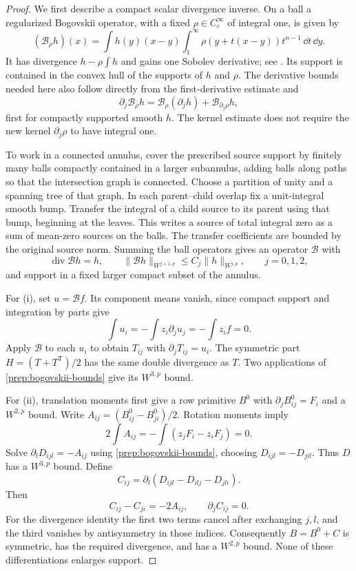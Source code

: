 \begin{proof}
We first describe a compact scalar divergence inverse.  On a ball a
regularized Bogovskii operator, with a fixed
$\rho\in C_c^\infty$ of integral one, is given by
\[
 (\mathcal B_\rho h)(x)
 =\int h(y)(x-y)\int_1^\infty
       \rho(y+t(x-y))t^{n-1}\,\dd t\,\dd y.
\]
It has divergence $h-\rho\int h$ and gains one Sobolev derivative;
see \cite{CostabelMcIntosh2010}.  Its support is contained in the
convex hull of the supports of $h$ and $\rho$.  The derivative bounds
needed here also follow directly from the first-derivative estimate
and
\[
 \partial_j\mathcal B_\rho h
 =\mathcal B_\rho(\partial_jh)
       +\mathcal B_{\partial_j\rho}h,
\]
first for compactly supported smooth $h$.  The kernel estimate does not
require the new kernel $\partial_j\rho$ to have integral one.

To work in a connected annulus, cover the prescribed source support by
finitely many balls compactly contained in a larger subannulus, adding
balls along paths so that the intersection graph is connected.  Choose
a partition of unity and a spanning tree of that graph.  In each
parent--child overlap fix a unit-integral smooth bump.  Transfer the
integral of a child source to its parent using that bump, beginning at
the leaves.  This writes a source of total integral zero as a sum of
mean-zero sources on the balls.  The transfer coefficients are bounded
by the original source norm.  Summing the ball operators gives an
operator $\mathcal B$ with
\begin{equation}
 \label{prep:bogovskii-bounds}
 \operatorname{div}\mathcal B h=h,
 \qquad \|\mathcal B h\|_{W^{j+1,p}}
       \leq C_j\|h\|_{W^{j,p}},\qquad j=0,1,2,
\end{equation}
and support in a fixed larger compact subset of the annulus.

For (i), set $u=\mathcal B f$.  Its component means vanish, since compact
support and integration by parts give
\[
 \int u_i=-\int z_i\partial_j u_j=-\int z_i f=0.
\]
Apply $\mathcal B$ to each $u_i$ to obtain $T_{ij}$ with
$\partial_jT_{ij}=u_i$.  The symmetric part
$H=(T+T^{\mathsf T})/2$ has the same double divergence as $T$.
Two applications of \eqref{prep:bogovskii-bounds} give its $W^{3,p}$
bound.

For (ii), translation moments first give a row primitive $B^0$ with
$\partial_jB^0_{ij}=F_i$ and a $W^{2,p}$ bound.  Write
$A_{ij}=(B^0_{ij}-B^0_{ji})/2$.  Rotation moments imply
\[
 2\int A_{ij}=-\int(z_jF_i-z_iF_j)=0.
\]
Solve $\partial_lD_{ijl}=-A_{ij}$ using \eqref{prep:bogovskii-bounds},
choosing $D_{ijl}=-D_{jil}$.  Thus $D$ has a $W^{3,p}$ bound.  Define
\[
 C_{ij}=\partial_l(D_{ijl}-D_{ilj}-D_{jli}).
\]
Then
\[
 C_{ij}-C_{ji}=-2A_{ij},\qquad
 \partial_jC_{ij}=0.
\]
For the divergence identity the first two terms cancel after exchanging
$j,l$, and the third vanishes by antisymmetry in those indices.
Consequently $B=B^0+C$ is symmetric, has the required divergence, and
has a $W^{2,p}$ bound.  None of these differentiations enlarges support.


\end{proof}
